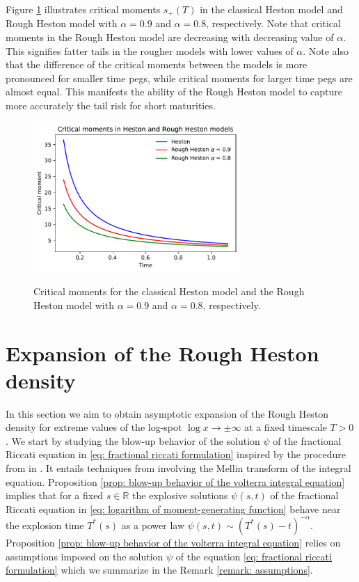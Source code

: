 \documentclass[12pt,twoside]{article}
\theoremstyle{plain}
\theoremstyle{plain}
\theoremstyle{definition}
\theoremstyle{remark}
\numberwithin{equation}{section}
\begin{document}
Figure \ref{fig: critical moments} illustrates critical moments $s_+(T)$ in the classical Heston model and Rough Heston model with $\alpha=0.9$ and $\alpha=0.8$, respectively. Note that critical moments in the Rough Heston model are decreasing with decreasing value of $\alpha$. This signifies fatter tails in the rougher models with lower values of $\alpha$. Note also that the difference of the critical moments between the models is more pronounced for smaller time pegs, while critical moments for larger time pegs are almost equal. This manifests the ability of the Rough Heston model to capture more accurately the tail risk for short maturities.

\newpage\clearpage

\vspace{20pt}

\begin{figure}[H]
\centering
\includegraphics[width=0.7\textwidth]{figures/critical_moments.pdf} \\
\caption{Critical moments for the classical Heston model and the Rough Heston model with $\alpha=0.9$ and $\alpha=0.8$, respectively.}
\label{fig: critical moments}
\end{figure}

\section{Expansion of the Rough Heston density}
\label{sec: expansion of the rough heston density}

In this section we aim to obtain asymptotic expansion of the Rough Heston density for extreme values of the log-spot $\log x \rightarrow \pm \infty$ at a fixed timescale $T>0$.
We start by studying the blow-up behavior of the solution $\psi$ of the fractional Riccati equation in \eqref{eq: fractional riccati formulation} inspired by the procedure from in \cite{RO96}. It entails techniques from \cite{BH75} involving the Mellin transform of the integral equation. Proposition \ref{prop: blow-up behavior of the volterra integral equation} implies that for a fixed $s\in \mathbb R$ the explosive solutions $\psi(s, t)$ of the fractional Riccati equation in \eqref{eq: logarithm of moment-generating function} behave near the explosion time $T^*(s)$ as a power law $\psi(s, t) \sim (T^*(s) - t)^{-\alpha}$. Proposition \ref{prop: blow-up behavior of the volterra integral equation} relies on assumptions imposed on the solution $\psi$ of the equation \eqref{eq: fractional riccati formulation} which we summarize in the Remark \ref{remark: assumptions}.
\end{document}
